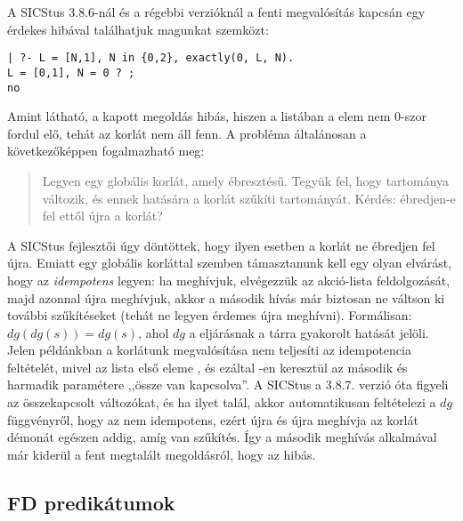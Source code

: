 A SICStus 3.8.6-nál és a régebbi verzióknál a fenti megvalósítás kapcsán egy érdekes
hibával találhatjuk magunkat szemközt:

\begin{verbatim}
| ?- L = [N,1], N in {0,2}, exactly(0, L, N).
L = [0,1], N = 0 ? ;
no
\end{verbatim}

Amint látható, a kapott megoldás hibás, hiszen a \cd{[0,1]} listában a  elem
nem 0-szor fordul elő, tehát az  korlát nem áll fenn. A probléma
általánosan a következőképpen fogalmazható meg:

\begin{quote}
Legyen  egy globális korlát, amely 
ébresztésű. Tegyük fel, hogy  tartománya változik, és ennek hatására
a korlát szűkíti  tartományát. Kérdés: ébredjen-e fel ettől újra a
korlát?
\end{quote}

A SICStus fejlesztői úgy döntöttek, hogy ilyen esetben a korlát ne ébredjen fel újra.
Emiatt egy globális korláttal szemben támasztanunk kell egy olyan elvárást, hogy az
\emph{idempotens} legyen: ha meghívjuk, elvégezzük az akció-lista feldolgozását,
majd azonnal újra meghívjuk, akkor a második hívás már biztosan ne váltson ki további
szűkítéseket (tehát ne legyen érdemes újra meghívni). Formálisan: $dg(dg(s))=dg(s)$,
ahol $dg$ a  eljárásnak a tárra gyakorolt hatását jelöli.
\br
Jelen példánkban a korlátunk megvalósítása nem teljesíti az idempotencia feltételét,
mivel az  lista első eleme , és ezáltal -en keresztül az 
második és harmadik paramétere ,,össze van kapcsolva''. A SICStus a 3.8.7. verzió óta
figyeli az összekapcsolt változókat, és ha ilyet talál, akkor automatikusan feltételezi
a $dg$ függvényről, hogy az nem idempotens, ezért újra és újra meghívja az 
korlát démonát egészen addig, amíg van szűkítés. Így a második meghívás alkalmával
már kiderül a fent megtalált megoldásról, hogy az hibás.

\subsection{FD predikátumok}

\label{fdpred}


